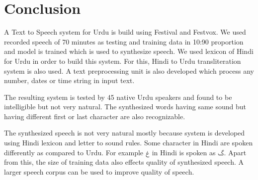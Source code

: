 \chapter{Conclusion}

A Text to Speech system for Urdu is build using Festival and Festvox. We used recorded speech of 70 minutes as testing and training data in 10:90 proportion and model is trained which is used to synthesize speech. We used lexicon of Hindi for Urdu in order to build this system. For this, Hindi to Urdu transliteration system is also used. A text preprocessing unit is also developed which process any number, dates or time string in input text. 

The resulting system is tested by 45 native Urdu speakers and found to be intelligible but not very natural. The synthesized words having same sound but having different first or last character are also recognizable. 

The synthesized speech is not very natural mostly because system is developed using Hindi lexicon and letter to sound rules. Some character in Hindi are spoken differently as compared to Urdu. For example \texturdu{‫غ‬} in Hindi is spoken as \texturdu{گ}. Apart from this, the size of training data also effects quality of synthesized speech. A larger speech corpus can be used to improve quality of speech.